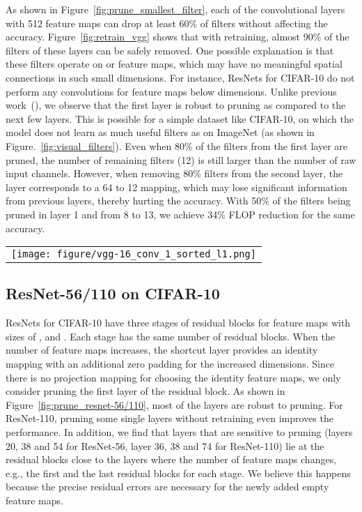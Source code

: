 \documentclass{article} \usepackage{iclr2017_conference,times}
\begin{document}
As shown in Figure~\ref{fig:prune_smallest_filter}, each of the convolutional layers with 512 feature maps can drop at least 60\% of filters without affecting the accuracy.
Figure~\ref{fig:retrain_vgg} shows that with retraining, almost 90\% of the filters of these layers can be safely removed.
One possible explanation is that these filters operate on  or  feature maps, which may have no meaningful spatial connections in such small dimensions.
For instance, ResNets for CIFAR-10 do not perform any convolutions for feature maps below  dimensions.
Unlike previous work~(\cite{zeiler2014visualizing, han2015learning}), we observe that the first layer is robust to pruning as compared to the next few layers.
This is possible for a simple dataset like CIFAR-10, on which the model does not learn as much useful filters as on ImageNet (as shown in Figure.~\ref{fig:visual_filters}).
Even when 80\% of the filters from the first layer are pruned, the number of remaining filters (12) is still larger than the number of raw input channels.
However, when removing 80\% filters from the second layer, the layer corresponds to a 64 to 12 mapping, which may lose significant information from previous layers, thereby hurting the accuracy.
With 50\% of the filters being pruned in layer 1 and from 8 to 13, we achieve 34\% FLOP reduction for the same accuracy.

\begin{figure*}[h]
\centering
\begin{tabular}{l}
 \texttt{[image: figure/vgg-16\_conv\_1\_sorted\_l1.png]}
\end{tabular}
\caption{Visualization of filters in the first convolutional layer of VGG-16 trained on CIFAR-10. Filters are ranked by -norm.}
\label{fig:visual_filters}
\end{figure*}

\subsection{ResNet-56/110 on CIFAR-10}
ResNets for CIFAR-10 have three stages of residual blocks for feature maps with sizes of ,  and .
Each stage has the same number of residual blocks.
When the number of feature maps increases, the shortcut layer provides an identity mapping with an additional zero padding for the increased dimensions.
Since there is no projection mapping for choosing the identity feature maps, we only consider pruning the first layer of the residual block.
As shown in Figure~\ref{fig:prune_resnet-56/110}, most of the layers are robust to pruning.
For ResNet-110, pruning some single layers without retraining even improves the performance.
In addition, we find that layers that are sensitive to pruning (layers 20, 38 and 54 for ResNet-56, layer 36, 38 and 74 for ResNet-110) lie at the residual blocks close to the layers where the number of feature maps changes, e.g., the first and the last residual blocks for each stage.
We believe this happens because the precise residual errors are necessary for the newly added empty feature maps.
\end{document}
